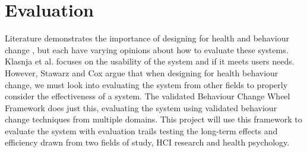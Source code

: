 
\newpage
\section{Evaluation}

Literature demonstrates the importance of designing for health and behaviour change \cite{article_mhealth, article_designing_for_healthy_lifestyles, article_designing_for_health_behaviour_change_hci}, but each have varying opinions about how to evaluate these systems. Klasnja et al. \cite{article_evaluate_tech_health_behaviour_change} focuses on the usability of the system and if it meets users needs. However, Stawarz and Cox \cite{article_designing_for_health_behaviour_change_hci} argue that when designing for health behaviour change, we must look into evaluating the system from other fields to properly consider the effectiveness of a system. The validated Behaviour Change Wheel Framework \cite{article_behaviour_change_wheel} does just this, evaluating the system using validated behaviour change techniques from multiple domains. This project will use this framework to evaluate the system with evaluation trails testing the long-term effects and efficiency drawn from two fields of study, HCI research and health psychology.

